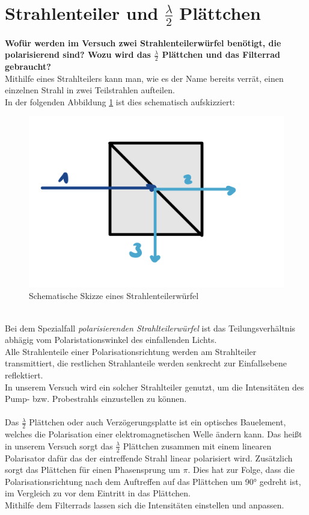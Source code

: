 \newpage
\section{Strahlenteiler und $\frac{\lambda}{2}$ Plättchen}
\textbf{Wofür werden im Versuch zwei Strahlenteilerwürfel benötigt, die polarisierend sind? 
Wozu wird das $\frac{\lambda}{2}$ Plättchen und das Filterrad gebraucht?}\\
Mithilfe eines Strahlteilers kann man, wie es der Name bereits verrät, 
einen einzelnen Strahl in zwei Teilstrahlen aufteilen.\\
In der folgenden Abbildung \ref{fig:Strahlenteiler} ist dies schematisch aufskizziert:
\begin{figure}[h]
    \centering
    \includegraphics[scale=0.1]{Bilder/FzV/Strahlenteiler.jpg}
    \caption{Schematische Skizze eines Strahlenteilerwürfel}
    \label{fig:Strahlenteiler}
   \end{figure}\\
Bei dem Spezialfall \textit{polarisierenden Strahlteilerwürfel} ist das
Teilungsverhältnis abhägig vom Polaristationswinkel des einfallenden Lichts. \\
Alle Strahlenteile einer Polarisationsrichtung werden am Strahlteiler transmittiert, 
die restlichen Strahlanteile werden senkrecht zur Einfallsebene reflektiert.\citep[vgl.][]{Strahlteiler}\\
In unserem Versuch wird ein solcher Strahlteiler genutzt, um die Intensitäten 
des Pump- bzw. Probestrahls einzustellen zu können.\\\\
Das $\frac{\lambda}{2}$ Plättchen oder auch Verzögerungsplatte ist ein optisches
Bauelement, welches die Polarisation einer elektromagnetischen Welle ändern kann. 
Das heißt in unserem Versuch sorgt das $\frac{\lambda}{2}$ Plättchen zusammen mit 
einem linearen Polarisator dafür das der eintreffende Strahl linear polarisiert wird. 
Zusätzlich sorgt das Plättchen für einen Phasensprung um $\pi$. Dies hat zur Folge, dass 
die Polarisationsrichtung nach dem Auftreffen auf das Plättchen um 90° gedreht ist, im 
Vergleich zu vor dem Eintritt in das Plättchen.\citep[vgl.][]{Platte}\\
Mithilfe dem Filterrads lassen sich die Intensitäten einstellen und anpassen.

